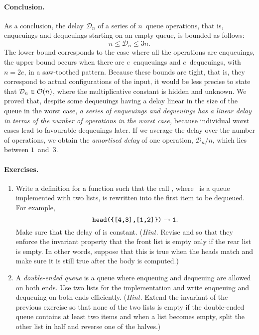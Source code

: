 \smallskip

\paragraph{Conclusion.}

As a conclusion, the delay \(\mathcal{D}_n\) of a series of
\(n\)~queue operations, that is, enqueuings and dequeuings starting on
an empty queue, is bounded as follows:
\[
 n \leqslant \mathcal{D}_n \leqslant 3n.
\]
The lower bound corresponds to the case where all the operations are
enqueuings, the upper bound occurs when there are \(e\)~enqueuings and
\(e\)~dequeuings, with \({n=2e}\), in a saw\hyp{}toothed
pattern. Because these bounds are tight, that is, they correspond to
actual configurations of the input, it would be less precise to state
that \(\mathcal{D}_n \in \mathcal{O}(n)\), where the multiplicative
constant is hidden and unknown. We proved that, despite some
dequeuings having a delay linear in the size of the queue in the worst
case, \emph{a series of enqueuings and dequeuings has a linear delay
  in terms of the number of operations in the worst case,} because
individual worst cases lead to favourable dequeuings later. If we
average the delay over the number of operations, we obtain the
\emph{amortised delay} of one operation, \(\mathcal{D}_n/n\), which
lies between \(1\)~and~\(3\).

\medskip

\paragraph{Exercises.}
\label{ex:queues}

\begin{enumerate}

  \item Write a definition for a function  such that
    the call , where ~is a queue
    implemented with two lists, is rewritten into the first item to be
    dequeued. For example,
    \[
     \texttt{head(\{[4,3],[1,2]\})} \twoheadrightarrow \texttt{1}.
    \]
    Make sure that the delay of  is
    constant. (\emph{Hint.} Revise  and
     so that they enforce the invariant property that
    the front list is empty only if the rear list is empty. In other
    words, suppose that this is true when the heads match and make
    sure it is still true after the body is computed.)

  \item A \emph{double\hyp{}ended queue} is a queue where enqueuing
    and dequeuing are allowed on both ends. Use two lists for the
    implementation and write enqueuing and dequeuing on both ends
    efficiently. (\emph{Hint.} Extend the invariant of the previous
    exercise so that none of the two lists is empty if the
    double\hyp{}ended queue contains at least two items and when a
    list becomes empty, split the other list in half and reverse one
    of the halves.)

\end{enumerate}

